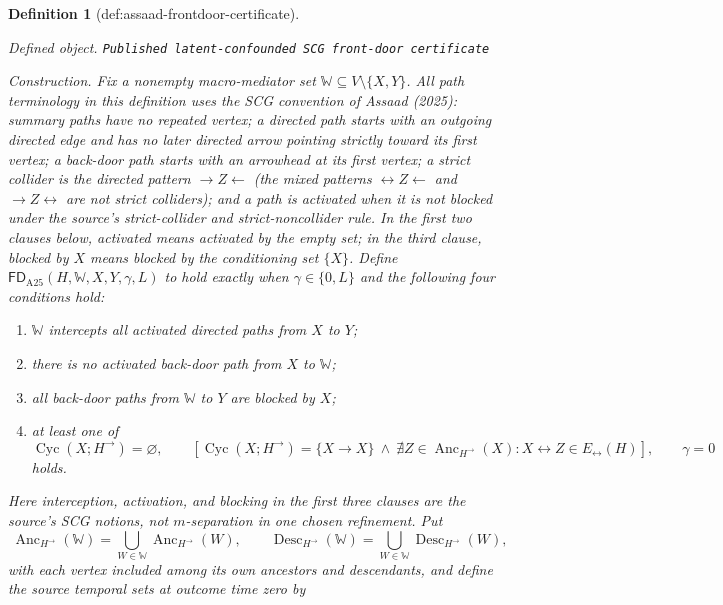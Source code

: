 \documentclass{article}
\newtheorem{definition}{Definition}
\begin{document}
\begin{definition}[def:assaad-frontdoor-certificate]\label{def:assaad-frontdoor-certificate}
\par\smallskip\noindent\emph{Defined object.} \texttt{Published latent-\allowbreak{}confounded SCG front-\allowbreak{}door certificate}
\par\smallskip\noindent\emph{Construction.} Fix a nonempty macro-mediator set \(\mathbb W\subseteq V\setminus\{X,Y\}\).  All path terminology in this definition uses the SCG convention of Assaad (2025): summary paths have no repeated vertex; a directed path starts with an outgoing directed edge and has no later directed arrow pointing strictly toward its first vertex; a back-door path starts with an arrowhead at its first vertex; a strict collider is the directed pattern \(\to Z\leftarrow\) (the mixed patterns \(\leftrightarrow Z\leftarrow\) and \(\to Z\leftrightarrow\) are not strict colliders); and a path is activated when it is not blocked under the source's strict-collider and strict-noncollider rule.  In the first two clauses below, activated means activated by the empty set; in the third clause, blocked by \(X\) means blocked by the conditioning set \(\{X\}\).  Define \(\mathsf{FD}_{\mathrm{A25}}(H,\mathbb W,X,Y,\gamma,L)\) to hold exactly when \(\gamma\in\{0,L\}\) and the following four conditions hold:
\begin{enumerate}
\item \(\mathbb W\) intercepts all activated directed paths from \(X\) to \(Y\);
\item there is no activated back-door path from \(X\) to \(\mathbb W\);
\item all back-door paths from \(\mathbb W\) to \(Y\) are blocked by \(X\);
\item at least one of
\[
 \operatorname{Cyc}(X;H^{\to})=\varnothing,
 \qquad
 \left[\operatorname{Cyc}(X;H^{\to})=\{X\to X\}
 \ \wedge\ 
 \nexists Z\in\operatorname{Anc}_{H^{\to}}(X):
 X\leftrightarrow Z\in E_{\leftrightarrow}(H)\right],
 \qquad
 \gamma=0
\]
holds.
\end{enumerate}
Here interception, activation, and blocking in the first three clauses are the source's SCG notions, not \(m\)-separation in one chosen refinement.  Put
\[
 \operatorname{Anc}_{H^{\to}}(\mathbb W)
 =\bigcup_{W\in\mathbb W}\operatorname{Anc}_{H^{\to}}(W),
 \qquad
 \operatorname{Desc}_{H^{\to}}(\mathbb W)
 =\bigcup_{W\in\mathbb W}\operatorname{Desc}_{H^{\to}}(W),
\]
with each vertex included among its own ancestors and descendants, and define the source temporal sets at outcome time zero by

\end{definition}
\end{document}

